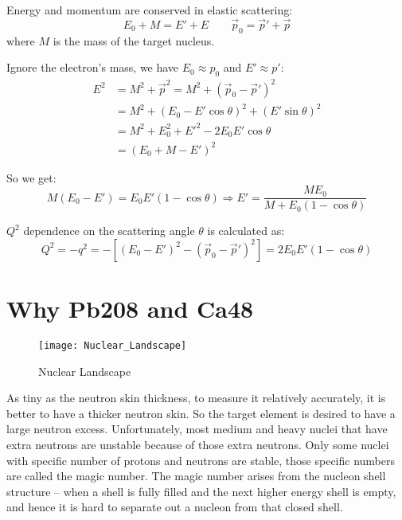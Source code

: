 Energy and momentum are conserved in elastic scattering:
$$ E_0 + M = E' + E \qquad \vec{p}_0 = \vec{p}' + \vec{p} $$
where $M$ is the mass of the target nucleus.

Ignore the electron's mass, we have $E_0 \approx p_0$ and $E' \approx p'$:
\begin{equation}
    \begin{aligned}
	E^2 &= M^2 + \vec{p}^2 = M^2 + (\vec{p}_0 - \vec{p}')^2  \\
	    &= M^2 + (E_0 - E'\cos\theta)^2 + (E'\sin\theta)^2	\\
	    &= M^2 + E_0^2 + E'^2 - 2E_0E'\cos\theta	\\
	    &= (E_0 + M - E')^2
    \end{aligned}
\end{equation}

So we get:
\begin{equation}
    M(E_0 - E') = E_0E'(1-\cos\theta)   \Longrightarrow
    E' = \frac{ME_0}{M + E_0(1-\cos\theta)}
\label{eq:scattered_energy}
\end{equation}

$Q^2$ dependence on the scattering angle $\theta$ is calculated as:
\begin{equation}
    Q^2 = -q^2 = -[(E_0 - E')^2 - (\vec{p}_0 - \vec{p}')^2] = 2E_0E'(1-\cos\theta)
    \label{eq:Q2}
\end{equation}

\section{Why Pb208 and Ca48}
\begin{figure}[!h]
    \centering
    \texttt{[image: Nuclear\_Landscape]}
    \caption{Nuclear Landscape}
    \label{fig:nuclear_landscape}
\end{figure}
As tiny as the neutron skin thickness, to measure it relatively accurately, it is
better to have a thicker neutron skin. So the target element is desired to
have a large neutron excess. Unfortunately, most medium and heavy nuclei that
have extra neutrons are unstable because of those extra neutrons. Only
some nuclei with specific number of protons and neutrons are stable, those specific
numbers are called the magic number. The magic number arises from the nucleon 
shell structure -- when a shell is fully filled and the next higher energy shell 
is empty, and hence it is hard to separate out a nucleon from that closed shell.

